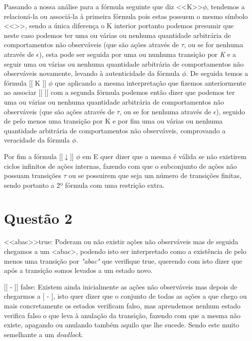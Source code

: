 \documentclass[11pt,a4paper]{report}
\begin{document}
Passando a nossa análise para a fórmula seguinte que diz \textless\textless K\textgreater\textgreater $\phi$, tendemos a relacioná-la ou associá-la à primeira fórmula pois estas possuem o mesmo símbolo \textless\textless\textgreater\textgreater, sendo a única diferença o K interior portanto podemos presumir que neste caso podemos ter uma ou várias ou nenhuma quantidade arbitrária de comportamentos não observáveis (que são ações através de $\tau$, ou se for nenhuma através de $\epsilon$), esta pode ser seguida por uma ou nunhuma transição por \emph{K} e a seguir  uma ou várias ou nenhuma quantidade arbitrária de comportamentos não observáveis novamente, levando à autenticidade da fórmula $\phi$.
\newpage
De seguida temos a fórmula [[ K ]] $\phi$ que aplicando a mesma interpretação que fizemos anteriormente ao associar [[ ]] com a segunda fórmula podemos então dizer que podemos ter uma ou várias ou nenhuma quantidade arbitrária de comportamentos não observáveis (que são ações através de $\tau$, ou se for nenhuma através de $\epsilon$), seguido de pelo menos uma transição por K e por fim uma ou várias ou nenhuma quantidade arbitrária de comportamentos não observáveis, comprovando a veracidade da fórmula $\phi$.

Por fim a fórmula [[$\downarrow$]] $\phi$ em E quer dizer que a mesma é válida se não existirem ciclos infinitos de ações internas, fazendo com que o subconjunto de ações não possuam transições $\tau$ ou se possuirem que seja um número de transições finitas, sendo portanto a 2º fórmula com uma restrição extra.

\section{Questão 2}

\textless\textless abac\textgreater\textgreater true: Poderam ou não existir ações não observáveis mas de seguida chegamos a um \textless abac\textgreater, podendo isto ser interpretado como a existência de pelo menos uma transição por \emph{"abac"} que verifique true, querendo com isto dizer que após a transição somos levados a um estado novo.

[[ - ]] false: Existem ainda inicialmente as ações não observáveis mas depois de chegarmos a [ - ], isto quer dizer que o conjunto de todas as ações a que chego ou mais concretamente os estados verificam falso, mas aprendemos nenhum estado verifica falso o que leva à anulação da transição, fazendo com que a mesma não existe, apagando ou anulando também aquilo que lhe sucede. Sendo este muito semelhante a um \emph{deadlock}. 
\end{document}

